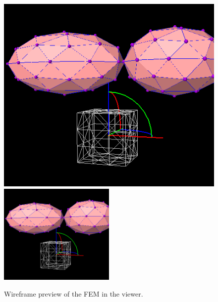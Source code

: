\documentclass{article}
\begin{document}
\begin{figure}
\begin{center}
\iflatexml
\includegraphics[]{images/addFemModelPreview}
\else
\includegraphics[width=0.50\textwidth]{images/addFemModelPreview}
\fi
\end{center}
\caption{Wireframe preview of the FEM in the viewer.}%
\label{addFemModelPreviewFig}
\end{figure}
\end{document}
